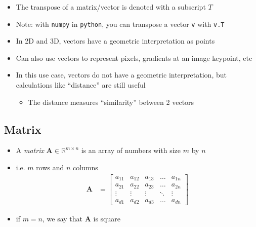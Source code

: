 \documentclass[letterpaper,12pt]{article}
\newcommand{\matr}[1]{\mathbf{#1}}
\begin{document}
\begin{itemize}
 \item The transpose of a matrix/vector is denoted with a subscript $T$
 \item Note: with \lstinline{numpy} in \lstinline{python}, you can transpose a vector \lstinline{v} with \lstinline{v.T}
\end{itemize}

\begin{itemize}
 \item In 2D and 3D, vectors have a geometric interpretation as points
 \item Can also use vectors to represent pixels, gradients at an image keypoint, etc
 \item In this use case, vectors do not have a geometric interpretation, but calculations like ``distance'' are still useful
       \begin{itemize}
        \item The distance measures ``similarity'' between 2 vectors
       \end{itemize}
\end{itemize}

\subsection{Matrix}
\begin{itemize}
 \item A \textit{matrix} $\matr{A} \in \mathbb{R}^{m \times n}$ is an array of numbers with size $m$ by $n$
 \item i.e. $m$ rows and $n$ columns
       \begin{align}
        \matr{A} & =\begin{bmatrix}
         a_{11} & a_{12} & a_{13} & \dots  & a_{1n} \\
         a_{21} & a_{22} & a_{23} & \dots  & a_{2n} \\
         \vdots & \vdots & \vdots & \ddots & \vdots \\
         a_{d1} & a_{d2} & a_{d3} & \dots  & a_{dn}
        \end{bmatrix}
       \end{align}
 \item if $m=n$, we say that $\matr{A}$ is square
\end{itemize}
\end{document}
